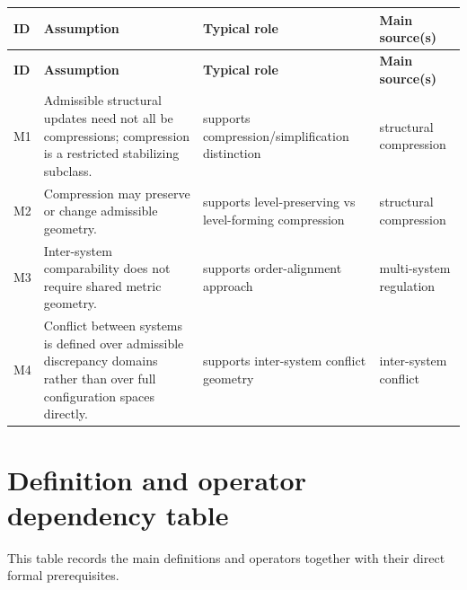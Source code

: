 \documentclass[11pt,a4paper]{article}
\begin{document}
	\begin{longtable}{>{\RaggedRight\arraybackslash}p{}
			>{\RaggedRight\arraybackslash}p{}
			>{\RaggedRight\arraybackslash}p{}
			>{\RaggedRight\arraybackslash}p{}}
		\toprule
		\textbf{ID} & \textbf{Assumption} & \textbf{Typical role} & \textbf{Main source(s)} \\
		\midrule
		\endfirsthead
		\toprule
		\textbf{ID} & \textbf{Assumption} & \textbf{Typical role} & \textbf{Main source(s)} \\
		\midrule
		\endhead
		
		M1 & Admissible structural updates need not all be compressions; compression is a restricted stabilizing subclass. & supports compression/simplification distinction & structural compression \\
		
		M2 & Compression may preserve or change admissible geometry. & supports level-preserving vs level-forming compression & structural compression \\
		
		M3 & Inter-system comparability does not require shared metric geometry. & supports order-alignment approach & multi-system regulation \\
		
		M4 & Conflict between systems is defined over admissible discrepancy domains rather than over full configuration spaces directly. & supports inter-system conflict geometry & inter-system conflict \\
		
		\bottomrule
	\end{longtable}
	
	\section{Definition and operator dependency table}
	
	This table records the main definitions and operators together with their direct formal
	prerequisites.
	
\end{document}
